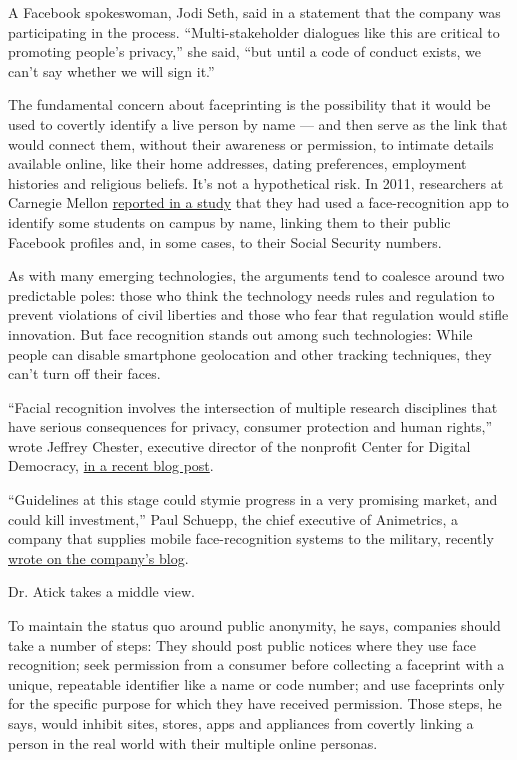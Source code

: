 A Facebook spokeswoman, Jodi Seth, said in a statement that the company
was participating in the process. ``Multi-stakeholder dialogues like
this are critical to promoting people's privacy,'' she said, ``but until
a code of conduct exists, we can't say whether we will sign it.''

The fundamental concern about faceprinting is the possibility that it
would be used to covertly identify a live person by name --- and then
serve as the link that would connect them, without their awareness or
permission, to intimate details available online, like their home
addresses, dating preferences, employment histories and religious
beliefs. It's not a hypothetical risk. In 2011, researchers at Carnegie
Mellon \href{http://bit.ly/NxlORs}{reported in a study} that they had
used a face-recognition app to identify some students on campus by name,
linking them to their public Facebook profiles and, in some cases, to
their Social Security numbers.

As with many emerging technologies, the arguments tend to coalesce
around two predictable poles: those who think the technology needs rules
and regulation to prevent violations of civil liberties and those who
fear that regulation would stifle innovation. But face recognition
stands out among such technologies: While people can disable smartphone
geolocation and other tracking techniques, they can't turn off their
faces.

``Facial recognition involves the intersection of multiple research
disciplines that have serious consequences for privacy, consumer
protection and human rights,'' wrote Jeffrey Chester, executive director
of the nonprofit Center for Digital Democracy,
\href{http://www.democraticmedia.org/dont-ask-dont-tell-ntia-multistakeholder-group-doesnt-want-know-how-facial-recognition-worksgoogfb-r}{in
a recent blog post}.

``Guidelines at this stage could stymie progress in a very promising
market, and could kill investment,'' Paul Schuepp, the chief executive
of Animetrics, a company that supplies mobile face-recognition systems
to the military, recently
\href{http://animetrics.com/animetrics-present-ntia-meeting/}{wrote on
the company's blog}.

Dr. Atick takes a middle view.

To maintain the status quo around public anonymity, he says, companies
should take a number of steps: They should post public notices where
they use face recognition; seek permission from a consumer before
collecting a faceprint with a unique, repeatable identifier like a name
or code number; and use faceprints only for the specific purpose for
which they have received permission. Those steps, he says, would inhibit
sites, stores, apps and appliances from covertly linking a person in the
real world with their multiple online personas.

